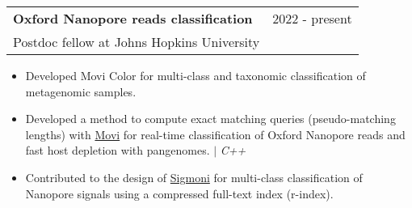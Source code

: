 \documentclass[A4,11pt]{article}
\makeatletter
\newcommand{\CVItem}[1]{
  \item\small{
    {#1 \vspace{-2pt}}
  }
}
\newcommand{\CVSubheading}[4]{
  \vspace{-2pt}\item
    \begin{tabular*}{0.97\textwidth}[t]{l@{\extracolsep{\fill}}r}
      \textbf{#1} & #2 \\
      \small#3 & \small #4 \\
    \end{tabular*}\vspace{-7pt}
}
\newcommand{\CVItemListStart}{\begin{itemize}}
\newcommand{\CVItemListEnd}{\end{itemize}\vspace{-5pt}}
\makeatother
\begin{document}
    \CVSubheading
      {Oxford Nanopore reads classification}{2022 - present}
      {Postdoc fellow at Johns Hopkins University}{ }
      \CVItemListStart
      \CVItem{Developed Movi Color for multi-class and taxonomic classification of metagenomic samples.}
      \CVItem{Developed a method to compute exact matching queries (pseudo-matching lengths) with \href{https://github.com/mohsenzakeri/movi}{Movi}
      for real-time classification of Oxford Nanopore reads and fast host depletion with pangenomes. $|$ \emph{\small{C++}}}
      \CVItem{Contributed to the design of \href{https://github.com/vshiv18/sigmoni}{Sigmoni} for multi-class classification of Nanopore signals using a compressed
      full-text index (r-index).}
      \CVItemListEnd
\end{document}
